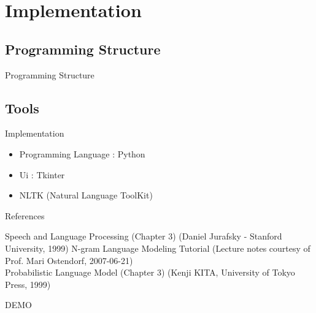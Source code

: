 \documentclass{beamer}
\begin{document}
\section{Implementation}
\subsection{Programming Structure}
\begin{frame}{Programming Structure}
    \smartdiagramset{}
    \begin{center}
    \end{center}
\end{frame}

\subsection{Tools}
\begin{frame}{Implementation}
    \begin{itemize}
        \item Programming Language : Python
        \item Ui : Tkinter
        \item NLTK (Natural Language ToolKit)
    \end{itemize}
\end{frame}


\begin{frame}{References}
    \begin{thebibliography}{4}
            Speech and Language Processing (Chapter 3) (Daniel Jurafsky - Stanford University, 1999)
            N-gram Language Modeling Tutorial (Lecture notes courtesy of Prof. Mari Ostendorf, 2007-06-21)\\
            Probabilistic Language Model (Chapter 3) (Kenji KITA, University of Tokyo Press, 1999)
    \end{thebibliography}
\end{frame}
\begin{frame}
    \centering
    \Huge DEMO
\end{frame}

\end{document}

